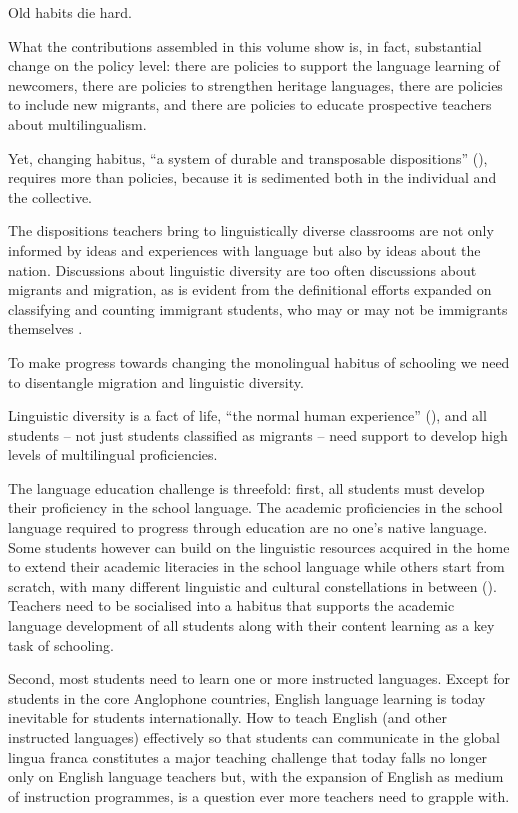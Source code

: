 \documentclass[output=paper]{langscibook}
\begin{document}
Old habits die hard.

What the contributions assembled in this volume show is, in fact, substantial change on the policy level: there are policies to support the language learning of newcomers, there are policies to strengthen heritage languages, there are policies to include new migrants, and there are policies to educate prospective teachers about multilingualism.

Yet, changing habitus, “a system of durable and transposable dispositions” (\citealt[261]{Bourdieu1993}), requires more than policies, because it is sedimented both in the individual and the collective.

The dispositions teachers bring to linguistically diverse classrooms are not only informed by ideas and experiences with language but also by ideas about the nation. Discussions about linguistic diversity are too often discussions about migrants and migration, as is evident from the definitional efforts expanded on classifying and counting immigrant students, who may or may not be immigrants themselves \parencite{chapters/1_reath}.

To make progress towards changing the monolingual habitus of schooling we need to disentangle migration and linguistic diversity.

Linguistic diversity is a fact of life, “the normal human experience” (\citealt{Goodenough1976}), and all students – not just students classified as migrants – need support to develop high levels of multilingual proficiencies.

The language education challenge is threefold: first, all students must develop their proficiency in the school language. The academic proficiencies in the school language required to progress through education are no one’s native language. Some students however can build on the linguistic resources acquired in the home to extend their academic literacies in the school language while others start from scratch, with many different linguistic and cultural constellations in between (\citealt{Heath1982}). Teachers need to be socialised into a habitus that supports the academic language development of all students along with their content learning as a key task of schooling.

Second, most students need to learn one or more instructed languages. Except for students in the core Anglophone countries, English language learning is today inevitable for students internationally. How to teach English (and other instructed languages) effectively so that students can communicate in the global lingua franca constitutes a major teaching challenge that today falls no longer only on English language teachers but, with the expansion of English as medium of instruction programmes, is a question ever more teachers need to grapple with.
\end{document}
